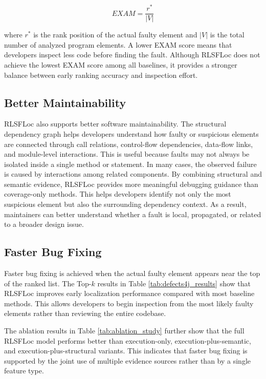 \documentclass[article,article,submit,pdftex,moreauthors]{Definitions/mdpi}
\begin{document}
\begin{equation}
EXAM =
\frac{r^*}{|V|}
\end{equation}

where $r^*$ is the rank position of the actual faulty element and $|V|$ is the total number of analyzed program elements. A lower EXAM score means that developers inspect less code before finding the fault. Although RLSFLoc does not achieve the lowest EXAM score among all baselines, it provides a stronger balance between early ranking accuracy and inspection effort.

\subsection{Better Maintainability}

RLSFLoc also supports better software maintainability. The structural dependency graph helps developers understand how faulty or suspicious elements are connected through call relations, control-flow dependencies, data-flow links, and module-level interactions. This is useful because faults may not always be isolated inside a single method or statement. In many cases, the observed failure is caused by interactions among related components. By combining structural and semantic evidence, RLSFLoc provides more meaningful debugging guidance than coverage-only methods. This helps developers identify not only the most suspicious element but also the surrounding dependency context. As a result, maintainers can better understand whether a fault is local, propagated, or related to a broader design issue.

\subsection{Faster Bug Fixing}

Faster bug fixing is achieved when the actual faulty element appears near the top of the ranked list. The Top-$k$ results in Table \ref{tab:defects4j_results} show that RLSFLoc improves early localization performance compared with most baseline methods. This allows developers to begin inspection from the most likely faulty elements rather than reviewing the entire codebase.

The ablation results in Table \ref{tab:ablation_study} further show that the full RLSFLoc model performs better than execution-only, execution-plus-semantic, and execution-plus-structural variants. This indicates that faster bug fixing is supported by the joint use of multiple evidence sources rather than by a single feature type.
\end{document}
